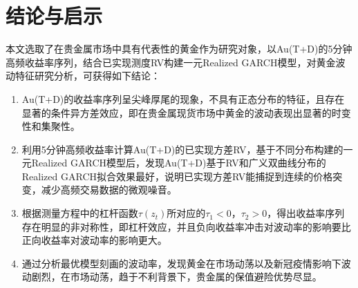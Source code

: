 \documentclass[UTF8,a4paper,12pt]{ctexart}  %
\begin{document}
\hypertarget{section-20}{%
\section{结论与启示}\label{section-20}}

本文选取了在贵金属市场中具有代表性的黄金作为研究对象，以Au(T+D)的5分钟高频收益率序列，结合已实现测度RV构建一元Realized GARCH模型，对黄金波动特征研究分析，可获得如下结论：

\begin{enumerate}
\def\labelenumi{\arabic{enumi}.}
\item
  Au(T+D)的收益率序列呈尖峰厚尾的现象，不具有正态分布的特征，且存在显著的条件异方差效应，即在贵金属现货市场中黄金的波动表现出显著的时变性和集聚性。
\item
  利用5分钟高频收益率计算Au(T+D)的已实现方差RV，基于不同分布构建的一元Realized
  GARCH模型后，发现Au(T+D)基于RV和广义双曲线分布的Realized GARCH拟合效果最好，说明已实现方差RV能捕捉到连续的价格突变，减少高频交易数据的微观噪音。
\item
  根据测量方程中的杠杆函数\(\tau(z_{t})\)所对应的\(\tau_1<0\)，\(\tau_2>0\)，得出收益率序列存在明显的非对称性，即杠杆效应，并且负向收益率冲击对波动率的影响要比正向收益率对波动率的影响更大。
\item
  通过分析最优模型刻画的波动率，发现黄金在市场动荡以及新冠疫情影响下波动剧烈，在市场动荡，趋于不利背景下，贵金属的保值避险优势尽显。
\end{enumerate}





\end{document}
